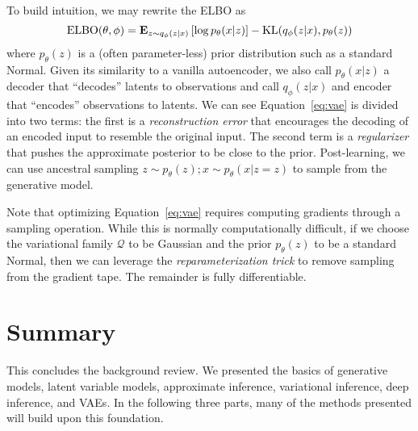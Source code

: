 To build intuition, we may rewrite the ELBO as
\begin{equation}
    \textup{ELBO}(\theta, \phi) = \mathbf{E}_{z \sim q_\phi(z|x)} \left[ \log p_\theta(x|z)\right] - \textup{KL}(q_\phi(z|x), p_\theta(z))
    \label{eq:vae}
\end{equation}
where $p_\theta(z)$ is a (often parameter-less) prior distribution such as a standard Normal. Given its similarity to a vanilla autoencoder, we also call $p_\theta(x|z)$ a  decoder that ``decodes'' latents to observations and call $q_\phi(z|x)$ and encoder that ``encodes'' observations to latents. We can see Equation~\ref{eq:vae} is divided into two terms: the first is a \textit{reconstruction error} that encourages the decoding of an encoded input to resemble the original input. The second term is a \textit{regularizer} that pushes the approximate posterior to be close to the prior. Post-learning, we can use ancestral sampling $z \sim p_\theta(z); x \sim p_\theta(x|z = z)$ to sample from the generative model.

Note that optimizing Equation~\ref{eq:vae} requires computing gradients through a sampling operation. While this is normally computationally difficult, if we choose the variational family $\mathcal{Q}$ to be Gaussian and the prior $p_\theta(z)$ to be a standard Normal, then we can leverage the \textit{reparameterization trick} \cite{kingma2013auto,rezende2014stochastic} to remove sampling from the gradient tape. The remainder is fully differentiable.

\section{Summary}

This concludes the background review. We presented the basics of generative models, latent variable models, approximate inference, variational inference, deep inference, and VAEs. In the following three parts, many of the methods presented will build upon this foundation. 